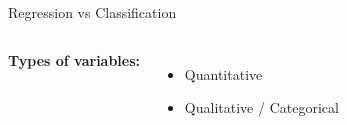 \documentclass[aspectratio=169,xcolor,dvipsnames]{beamer}
\newcommand{\InstructorNotes}[1]{{\color{orange}#1}}
\renewcommand{\InstructorNotes}[1]{}
\begin{document}
\begin{frame}[c]{Regression vs Classification}


\begin{columns}
\textbf{Types of variables:} \InstructorNotes{Emphasize this is output variable, and which it is determines regression vs classification}

\begin{itemize}
	\item Quantitative

\InstructorNotes{Ex: Blood pressure, temperature, volume, height, income}
	\vspace{1in}

	\item Qualitative / Categorical

\InstructorNotes{Purchased a ticket, owns a house, Job, Digit in MNIST, }

	\vspace{ 1in}
\end{itemize}

\end{columns}

\InstructorNotes{Emphasize that this has to do with the output variable type}

\end{frame}
\end{document}
